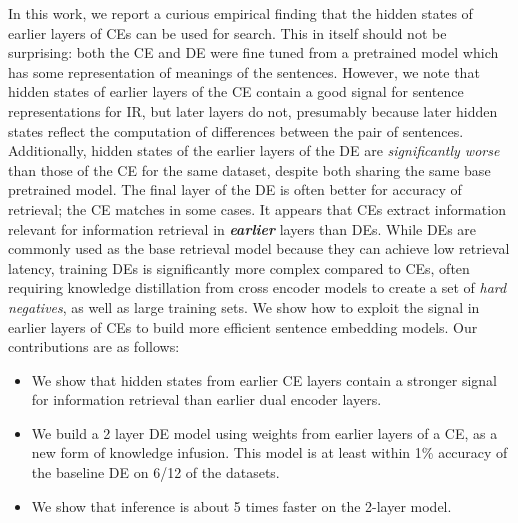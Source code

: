 In this work, we report a curious empirical finding that the hidden states of earlier layers of CEs can be used for search.  This in itself should not be surprising: both the CE and DE were fine tuned from a pretrained model which has some representation of meanings of the sentences. However, we note that hidden states of earlier layers of the CE contain a good signal for sentence representations for IR, but later layers do not, presumably because later hidden states reflect the computation of differences between the pair of sentences. Additionally, hidden states of the earlier layers of the DE are \textit{significantly worse} than those of the CE for the same dataset, despite both sharing the same base pretrained model. The final layer of the DE is often better for accuracy of retrieval; the CE matches in some cases.  It appears that CEs extract information relevant for information retrieval in \textbf{\textit{earlier}} layers than DEs.  While DEs are commonly used as the base retrieval model because they can achieve low retrieval latency, training DEs is significantly more complex compared to CEs, often requiring knowledge distillation from cross encoder models to create a set of \textit{hard negatives}, as well as large training sets. We show how to exploit the signal in earlier layers of CEs to build more efficient sentence embedding models.
Our contributions are as follows:
\begin{itemize}
    \item We show that hidden states from earlier CE layers contain a stronger signal for information retrieval than earlier dual encoder layers.
    \item We build a 2 layer DE model using weights from earlier layers of a CE, as a new form of knowledge infusion.  This model is at least within 1\% accuracy of the baseline DE on 6/12 of the datasets.
    \item We show that inference is about 5 times faster on the 2-layer model.
\end{itemize}
